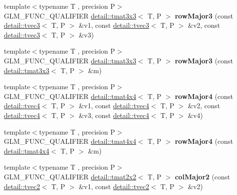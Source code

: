 \begin{DoxyCompactItemize}
\item 
{\footnotesize template$<$typename T , precision P$>$ }\\G\+L\+M\+\_\+\+F\+U\+N\+C\+\_\+\+Q\+U\+A\+L\+I\+F\+I\+ER \hyperlink{structglm_1_1detail_1_1tmat3x3}{detail\+::tmat3x3}$<$ T, P $>$ {\bfseries row\+Major3} (const \hyperlink{structglm_1_1detail_1_1tvec3}{detail\+::tvec3}$<$ T, P $>$ \&v1, const \hyperlink{structglm_1_1detail_1_1tvec3}{detail\+::tvec3}$<$ T, P $>$ \&v2, const \hyperlink{structglm_1_1detail_1_1tvec3}{detail\+::tvec3}$<$ T, P $>$ \&v3)\hypertarget{namespaceglm_a0e725f0de22e1b0069228cca14b4da89}{}\label{namespaceglm_a0e725f0de22e1b0069228cca14b4da89}

\item 
{\footnotesize template$<$typename T , precision P$>$ }\\G\+L\+M\+\_\+\+F\+U\+N\+C\+\_\+\+Q\+U\+A\+L\+I\+F\+I\+ER \hyperlink{structglm_1_1detail_1_1tmat3x3}{detail\+::tmat3x3}$<$ T, P $>$ {\bfseries row\+Major3} (const \hyperlink{structglm_1_1detail_1_1tmat3x3}{detail\+::tmat3x3}$<$ T, P $>$ \&m)\hypertarget{namespaceglm_afe7afcc122b143e55f4eefcc4464fb78}{}\label{namespaceglm_afe7afcc122b143e55f4eefcc4464fb78}

\item 
{\footnotesize template$<$typename T , precision P$>$ }\\G\+L\+M\+\_\+\+F\+U\+N\+C\+\_\+\+Q\+U\+A\+L\+I\+F\+I\+ER \hyperlink{structglm_1_1detail_1_1tmat4x4}{detail\+::tmat4x4}$<$ T, P $>$ {\bfseries row\+Major4} (const \hyperlink{structglm_1_1detail_1_1tvec4}{detail\+::tvec4}$<$ T, P $>$ \&v1, const \hyperlink{structglm_1_1detail_1_1tvec4}{detail\+::tvec4}$<$ T, P $>$ \&v2, const \hyperlink{structglm_1_1detail_1_1tvec4}{detail\+::tvec4}$<$ T, P $>$ \&v3, const \hyperlink{structglm_1_1detail_1_1tvec4}{detail\+::tvec4}$<$ T, P $>$ \&v4)\hypertarget{namespaceglm_a32a1242ee6d09460aefb53bfba4a22ed}{}\label{namespaceglm_a32a1242ee6d09460aefb53bfba4a22ed}

\item 
{\footnotesize template$<$typename T , precision P$>$ }\\G\+L\+M\+\_\+\+F\+U\+N\+C\+\_\+\+Q\+U\+A\+L\+I\+F\+I\+ER \hyperlink{structglm_1_1detail_1_1tmat4x4}{detail\+::tmat4x4}$<$ T, P $>$ {\bfseries row\+Major4} (const \hyperlink{structglm_1_1detail_1_1tmat4x4}{detail\+::tmat4x4}$<$ T, P $>$ \&m)\hypertarget{namespaceglm_acf62444b33c651b502b10bc73221811a}{}\label{namespaceglm_acf62444b33c651b502b10bc73221811a}

\item 
{\footnotesize template$<$typename T , precision P$>$ }\\G\+L\+M\+\_\+\+F\+U\+N\+C\+\_\+\+Q\+U\+A\+L\+I\+F\+I\+ER \hyperlink{structglm_1_1detail_1_1tmat2x2}{detail\+::tmat2x2}$<$ T, P $>$ {\bfseries col\+Major2} (const \hyperlink{structglm_1_1detail_1_1tvec2}{detail\+::tvec2}$<$ T, P $>$ \&v1, const \hyperlink{structglm_1_1detail_1_1tvec2}{detail\+::tvec2}$<$ T, P $>$ \&v2)\hypertarget{namespaceglm_a222ceea0b7d214bab27ffce711613959}{}\label{namespaceglm_a222ceea0b7d214bab27ffce711613959}


\end{DoxyCompactItemize}
